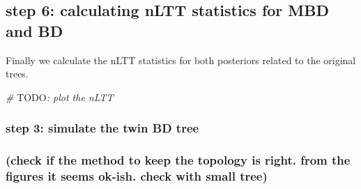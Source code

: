 \documentclass[]{article}
\newenvironment{Shaded}{\begin{snugshade}}{\end{snugshade}}
\newcommand{\KeywordTok}[1]{\textcolor[rgb]{0.13,0.29,0.53}{\textbf{#1}}}
\newcommand{\DecValTok}[1]{\textcolor[rgb]{0.00,0.00,0.81}{#1}}
\newcommand{\StringTok}[1]{\textcolor[rgb]{0.31,0.60,0.02}{#1}}
\newcommand{\CommentTok}[1]{\textcolor[rgb]{0.56,0.35,0.01}{\textit{#1}}}
\newcommand{\ControlFlowTok}[1]{\textcolor[rgb]{0.13,0.29,0.53}{\textbf{#1}}}
\newcommand{\OperatorTok}[1]{\textcolor[rgb]{0.81,0.36,0.00}{\textbf{#1}}}
\newcommand{\AlertTok}[1]{\textcolor[rgb]{0.94,0.16,0.16}{#1}}
\newcommand{\NormalTok}[1]{#1}
\begin{document}
\subsection{step 6: calculating nLTT statistics for MBD and
BD}\label{step-6-calculating-nltt-statistics-for-mbd-and-bd}

Finally we calculate the nLTT statistics for both posteriors related to
the original trees.

\begin{Shaded}
\end{Shaded}

\begin{Shaded}
\begin{Highlighting}[]
\CommentTok{# }\AlertTok{TODO}\CommentTok{: plot the nLTT}
\end{Highlighting}
\end{Shaded}

\subsubsection{step 3: simulate the twin BD
tree}\label{step-3-simulate-the-twin-bd-tree}

\subsubsection{(check if the method to keep the topology is right. from
the figures it seems ok-ish. check with small
tree)}\label{check-if-the-method-to-keep-the-topology-is-right.-from-the-figures-it-seems-ok-ish.-check-with-small-tree}
\end{document}
